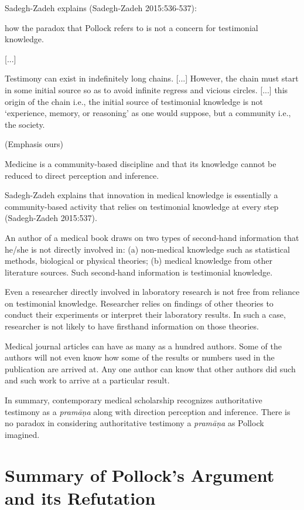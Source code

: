 Sadegh-Zadeh explains (Sadegh-Zadeh 2015:536-537):
\begin{myquote}
how the paradox that Pollock refers to is not a concern for testimonial knowledge.  

[...]

Testimony can exist in indefinitely long chains. [...]  However, the chain must start in some initial source so as to avoid infinite regress and vicious circles.  [...] this origin of the chain i.e., the initial source of testimonial knowledge is not `experience, memory, or reasoning' as one would suppose, but a community i.e., the society.

\hfill (Emphasis ours)
\end{myquote}

Medicine is a community-based discipline and that its knowledge cannot be reduced to direct perception and inference. 

Sadegh-Zadeh explains that innovation in medical knowledge is essentially a community-based activity that relies on testimonial knowledge at every step (Sadegh-Zadeh 2015:537).

An author of a medical book draws on two types of second-hand information that he/she is not directly involved in: (a) non-medical knowledge such as statistical methods, biological or physical theories; (b) medical knowledge from other literature sources.  Such second-hand information is testimonial knowledge.

Even a researcher directly involved in laboratory research is not free from reliance on testimonial knowledge. Researcher relies on findings of other theories to conduct their experiments or interpret their laboratory results. In such a case, researcher is not likely to have firsthand information on those theories.

Medical journal articles can have as many as a hundred authors. Some of the authors will not even know how some of the results or numbers used in the publication are arrived at. Any one author can know that other authors did such and such work to arrive at a particular result.

In summary, contemporary medical scholarship recognizes authoritative testimony as a {\sl pramāṇa} along with direction perception and inference. There is no paradox in considering authoritative testimony a {\sl pramāṇa} as Pollock imagined.


\section*{Summary of Pollock's Argument and its Refutation}


